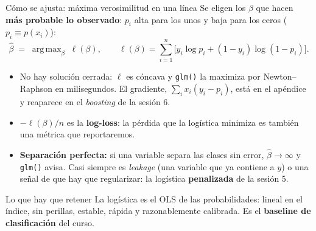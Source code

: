 \documentclass{beamer}
\newcommand{\1}{\mathbb{I}}
\DeclareMathOperator*{\argmax}{arg\,max}
\begin{document}
\begin{frame}{Cómo se ajusta: máxima verosimilitud en una línea}
\small
Se eligen los $\beta$ que hacen \textbf{más probable lo observado}: $p_i$ alta para los unos y baja para los ceros ($p_i \equiv p(x_i)$):
\[ \hat{\beta} \;=\; \argmax_{\beta} \; \ell(\beta), \qquad \ell(\beta) = \sum_{i=1}^{n} \Big[ y_i \log p_i + (1 - y_i) \log (1 - p_i) \Big]. \]
\pause
\begin{itemize}\itemsep4pt
  \item No hay solución cerrada: $\ell$ es cóncava y \texttt{glm()} la maximiza por Newton--Raphson en milisegundos. El gradiente, $\sum_i x_i (y_i - p_i)$, está en el apéndice y reaparece en el \emph{boosting} de la sesión 6. \pause
  \item $-\ell(\beta)/n$ es la \textbf{log-loss}: la pérdida que la logística minimiza es también una métrica que reportaremos. \pause
  \item \textbf{Separación perfecta:} si una variable separa las clases sin error, $\hat{\beta} \to \infty$ y \texttt{glm()} avisa. Casi siempre es \emph{leakage} (una variable que ya contiene a $y$) o una señal de que hay que regularizar: la logística \textbf{penalizada} de la sesión 5.
\end{itemize}
\pause
\begin{block}{Lo que hay que retener}
La logística es el OLS de las probabilidades: lineal en el índice, sin perillas, estable, rápida y razonablemente calibrada. Es el \textbf{baseline de clasificación} del curso.
\end{block}
\end{frame}
\end{document}
